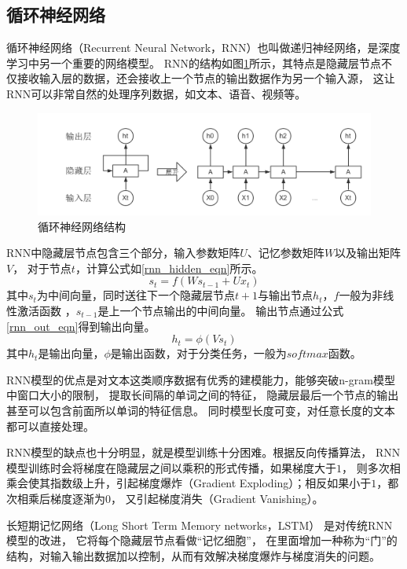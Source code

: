 \subsection{循环神经网络}
循环神经网络（Recurrent Neural Network，RNN）也叫做递归神经网络，是深度学习中另一个重要的网络模型。
RNN的结构如图\ref{RNN}所示，其特点是隐藏层节点不仅接收输入层的数据，还会接收上一个节点的输出数据作为另一个输入源，
这让RNN可以非常自然的处理序列数据，如文本、语音、视频等。
\begin{figure}[h]
    \includegraphics[scale=0.4]{picture/RNN.png}
    \caption{循环神经网络结构}
    \label{RNN}
\end{figure}
RNN中隐藏层节点包含三个部分，输入参数矩阵$U$、记忆参数矩阵$W$以及输出矩阵$V$，
对于节点$t$，计算公式如\ref{rnn_hidden_eqn}所示。
\begin{equation}
    s_t=f\left ( Ws_{t-1}+Ux_t \right )
    \label{rnn_hidden_eqn}
\end{equation}
其中$s_t$为中间向量，同时送往下一个隐藏层节点$t+1$与输出节点$h_t$，$f$一般为非线性激活函数
，$s_{t-1}是上一个节点输出的中间向量$。
输出节点通过公式\ref{rnn_out_eqn}得到输出向量。
\begin{equation}
    h_t=\phi\left ( Vs_t \right )
    \label{rnn_out_eqn}
\end{equation}
其中$h_t$是输出向量，$\phi$是输出函数，对于分类任务，一般为$softmax$函数。

RNN模型的优点是对文本这类顺序数据有优秀的建模能力，能够突破n-gram模型中窗口大小的限制，
提取长间隔的单词之间的特征，
隐藏层最后一个节点的输出甚至可以包含前面所以单词的特征信息。
同时模型长度可变，对任意长度的文本都可以直接处理。

RNN模型的缺点也十分明显，就是模型训练十分困难。根据反向传播算法，
RNN模型训练时会将梯度在隐藏层之间以乘积的形式传播，如果梯度大于$1$，
则多次相乘会使其指数级上升，引起梯度爆炸（Gradient Exploding）；相反如果小于$1$，都次相乘后梯度逐渐为$0$，
又引起梯度消失（Gradient Vanishing）。

长短期记忆网络（Long Short Term Memory networks，LSTM）
是对传统RNN模型的改进，
它将每个隐藏层节点看做“记忆细胞”，
在里面增加一种称为“门”的结构，对输入输出数据加以控制，从而有效解决梯度爆炸与梯度消失的问题。

